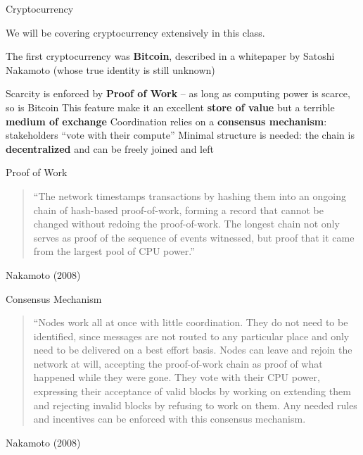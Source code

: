\documentclass[aspectratio=169]{beamer}
\begin{document}
\begin{frame}{Cryptocurrency}

We will be covering cryptocurrency extensively in this class. 

\vfill 
The first cryptocurrency was \textbf{Bitcoin}, described in a whitepaper by Satoshi Nakamoto (whose true identity is still unknown) 

\vfill 

\bi 
\m Scarcity is enforced by \textbf{Proof of Work} -- as long as computing power is scarce, so is Bitcoin 
\bi
\m This feature make it an excellent \textbf{store of value} but a terrible \textbf{medium of exchange} 
\ei 
\m Coordination relies on a \textbf{consensus mechanism}: stakeholders ``vote with their compute'' 
\m Minimal structure is needed: the chain is \textbf{decentralized} and can be freely joined and left 
\ei 

\end{frame}

\begin{frame}{Proof of Work}
    \begin{quote}
        ``The network timestamps transactions by hashing them into an ongoing chain of hash-based proof-of-work, forming a record that cannot be changed without redoing the proof-of-work. The longest chain not only serves as proof of the sequence of events witnessed, but proof that it came from the largest pool of CPU power.'' 
    \end{quote}
    \flushleft Nakamoto (2008)

\end{frame}


\begin{frame}{Consensus Mechanism}

\begin{quote}
    ``Nodes work all at once with little coordination. They do not need to be identified, since messages are not routed to any particular place and only need to be delivered on a best effort basis. Nodes can leave and rejoin the network at will, accepting the proof-of-work chain as proof of what happened while they were gone. They vote with their CPU power, expressing their acceptance of valid blocks by working on extending them and rejecting invalid blocks by refusing to work on them. Any needed rules and incentives can be enforced with this consensus mechanism.\\
\end{quote}
    \flushleft Nakamoto (2008)

    
\end{frame}
\end{document}
